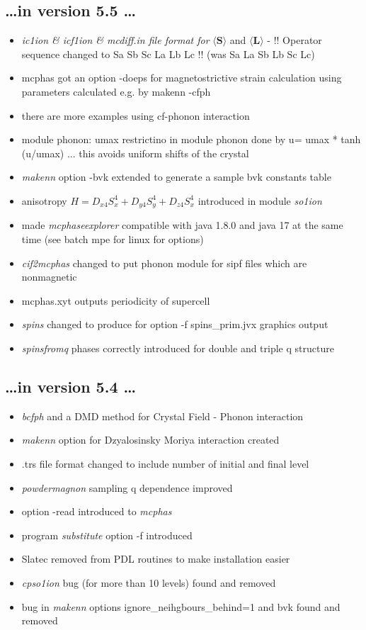 \documentclass[twoside]{article}
\newcommand{\mbf}[1]{\mathbf #1}
\newcommand{\prg}{\sl}
\begin{document}
\subsection*{ \dots in version 5.5 \dots}
\begin{itemize}
\item {\prg ic1ion \& icf1ion \& mcdiff.in file format for} $\langle \mbf S \rangle$
and  $\langle \mbf L \rangle$ - !!  Operator sequence changed to Sa Sb Sc La Lb Lc !! 
(was Sa La Sb Lb Sc Lc)
\item   mcphas got an option -doeps for magnetostrictive strain calculation using parameters
calculated e.g. by makenn -cfph 
\item  there are more examples using cf-phonon interaction
\item module phonon: umax restrictino in module phonon done by 
u= umax * tanh (u/umax) ... this avoids uniform shifts of the crystal 
\item {\prg makenn} option -bvk extended to generate a sample bvk constants table 
\item anisotropy $H=D_{x4} S_x^4 +D_{y4} S_y^4 +D_{z4} S_x^4$ introduced in module {\prg so1ion}
\item made {\prg mcphaseexplorer} compatible with java 1.8.0 and java 17 at the 
           same time (see batch mpe for linux for options) 
\item {\prg cif2mcphas} changed to put phonon module for sipf files which are nonmagnetic
\item  mcphas.xyt outputs periodicity of supercell
\item {\prg spins} changed to produce for option -f spins\_prim.jvx graphics output
\item  {\prg spinsfromq} phases correctly introduced for double and triple q structure
\end{itemize}

\subsection*{ \dots in version 5.4 \dots}
\begin{itemize}
\item    {\prg bcfph} and a DMD method for Crystal Field - Phonon interaction
\item  {\prg makenn} option for Dzyalosinsky Moriya interaction created
\item .trs file format changed to include number of initial and final level
\item   {\prg powdermagnon} sampling q dependence improved
\item option -read introduced to {\prg mcphas}
\item   program {\prg substitute} option -f introduced
\item   Slatec removed from PDL routines to make installation easier
\item {\prg cpso1ion} bug (for more than 10 levels) found and removed
\item bug in {\prg makenn} options ignore\_neihgbours\_behind=1 and bvk found and removed
\end{itemize}
\end{document}
